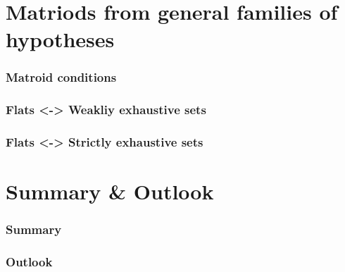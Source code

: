 \documentclass[bigger]{beamer}
\begin{document}
\section{Matriods from general families of hypotheses}



\begin{frame}
\frametitle{Matroid conditions}
\end{frame}



\begin{frame}
\frametitle{Flats <-> Weakliy exhaustive sets}
\end{frame}



\begin{frame}
\frametitle{Flats <-> Strictly exhaustive sets}
\end{frame}
\section{Summary \& Outlook}



\begin{frame}
\frametitle{Summary}
\end{frame}



\begin{frame}
\frametitle{Outlook}

\end{frame}
\end{document}
